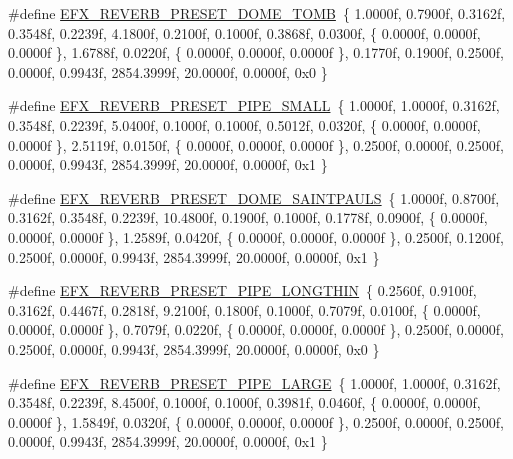 \begin{DoxyCompactItemize}
\item 
\#define \hyperlink{efx-presets_8h_a8172efac7fcdf447caf74b3588121f05}{E\+F\+X\+\_\+\+R\+E\+V\+E\+R\+B\+\_\+\+P\+R\+E\+S\+E\+T\+\_\+\+D\+O\+M\+E\+\_\+\+T\+O\+MB}~\{ 1.\+0000f, 0.\+7900f, 0.\+3162f, 0.\+3548f, 0.\+2239f, 4.\+1800f, 0.\+2100f, 0.\+1000f, 0.\+3868f, 0.\+0300f, \{ 0.\+0000f, 0.\+0000f, 0.\+0000f \}, 1.\+6788f, 0.\+0220f, \{ 0.\+0000f, 0.\+0000f, 0.\+0000f \}, 0.\+1770f, 0.\+1900f, 0.\+2500f, 0.\+0000f, 0.\+9943f, 2854.\+3999f, 20.\+0000f, 0.\+0000f, 0x0 \}
\item 
\#define \hyperlink{efx-presets_8h_a1965e441ad772bb05942baa1ffbd9297}{E\+F\+X\+\_\+\+R\+E\+V\+E\+R\+B\+\_\+\+P\+R\+E\+S\+E\+T\+\_\+\+P\+I\+P\+E\+\_\+\+S\+M\+A\+LL}~\{ 1.\+0000f, 1.\+0000f, 0.\+3162f, 0.\+3548f, 0.\+2239f, 5.\+0400f, 0.\+1000f, 0.\+1000f, 0.\+5012f, 0.\+0320f, \{ 0.\+0000f, 0.\+0000f, 0.\+0000f \}, 2.\+5119f, 0.\+0150f, \{ 0.\+0000f, 0.\+0000f, 0.\+0000f \}, 0.\+2500f, 0.\+0000f, 0.\+2500f, 0.\+0000f, 0.\+9943f, 2854.\+3999f, 20.\+0000f, 0.\+0000f, 0x1 \}
\item 
\#define \hyperlink{efx-presets_8h_a86a0f934e539989d9c39b390fd265e51}{E\+F\+X\+\_\+\+R\+E\+V\+E\+R\+B\+\_\+\+P\+R\+E\+S\+E\+T\+\_\+\+D\+O\+M\+E\+\_\+\+S\+A\+I\+N\+T\+P\+A\+U\+LS}~\{ 1.\+0000f, 0.\+8700f, 0.\+3162f, 0.\+3548f, 0.\+2239f, 10.\+4800f, 0.\+1900f, 0.\+1000f, 0.\+1778f, 0.\+0900f, \{ 0.\+0000f, 0.\+0000f, 0.\+0000f \}, 1.\+2589f, 0.\+0420f, \{ 0.\+0000f, 0.\+0000f, 0.\+0000f \}, 0.\+2500f, 0.\+1200f, 0.\+2500f, 0.\+0000f, 0.\+9943f, 2854.\+3999f, 20.\+0000f, 0.\+0000f, 0x1 \}
\item 
\#define \hyperlink{efx-presets_8h_a43dbaaefa9cfb5518b2b4e67149556ce}{E\+F\+X\+\_\+\+R\+E\+V\+E\+R\+B\+\_\+\+P\+R\+E\+S\+E\+T\+\_\+\+P\+I\+P\+E\+\_\+\+L\+O\+N\+G\+T\+H\+IN}~\{ 0.\+2560f, 0.\+9100f, 0.\+3162f, 0.\+4467f, 0.\+2818f, 9.\+2100f, 0.\+1800f, 0.\+1000f, 0.\+7079f, 0.\+0100f, \{ 0.\+0000f, 0.\+0000f, 0.\+0000f \}, 0.\+7079f, 0.\+0220f, \{ 0.\+0000f, 0.\+0000f, 0.\+0000f \}, 0.\+2500f, 0.\+0000f, 0.\+2500f, 0.\+0000f, 0.\+9943f, 2854.\+3999f, 20.\+0000f, 0.\+0000f, 0x0 \}
\item 
\#define \hyperlink{efx-presets_8h_a4e36a870da21838c4ddc94e9bcec4f53}{E\+F\+X\+\_\+\+R\+E\+V\+E\+R\+B\+\_\+\+P\+R\+E\+S\+E\+T\+\_\+\+P\+I\+P\+E\+\_\+\+L\+A\+R\+GE}~\{ 1.\+0000f, 1.\+0000f, 0.\+3162f, 0.\+3548f, 0.\+2239f, 8.\+4500f, 0.\+1000f, 0.\+1000f, 0.\+3981f, 0.\+0460f, \{ 0.\+0000f, 0.\+0000f, 0.\+0000f \}, 1.\+5849f, 0.\+0320f, \{ 0.\+0000f, 0.\+0000f, 0.\+0000f \}, 0.\+2500f, 0.\+0000f, 0.\+2500f, 0.\+0000f, 0.\+9943f, 2854.\+3999f, 20.\+0000f, 0.\+0000f, 0x1 \}

\end{DoxyCompactItemize}

